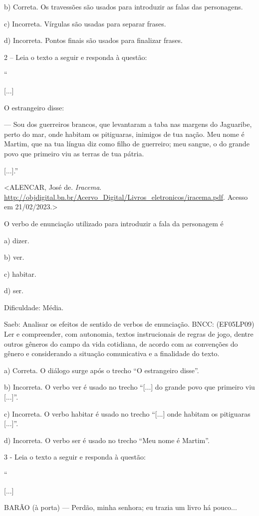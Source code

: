 b) Correta. Os travessões são usados para introduzir as falas das
personagens.

c) Incorreta. Vírgulas são usadas para separar frases.

d) Incorreta. Pontos finais são usados para finalizar frases.

2 -- Leia o texto a seguir e responda à questão:

``

{[}...{]}

O estrangeiro disse:

--- Sou dos guerreiros brancos, que levantaram a taba nas margens do
Jaguaribe, perto do mar, onde habitam os pitiguaras, inimigos de tua
nação. Meu nome é Martim, que na tua língua diz como filho de guerreiro;
meu sangue, o do grande povo que primeiro viu as terras de tua pátria.

{[}...{]}.''

\textless{}ALENCAR, José de. \emph{Iracema}.
\url{http://objdigital.bn.br/Acervo_Digital/Livros_eletronicos/iracema.pdf}.
Acesso em 21/02/2023.\textgreater{}

O verbo de enunciação utilizado para introduzir a fala da personagem é

a) dizer.

b) ver.

c) habitar.

d) ser.

Dificuldade: Média.

Saeb: Analisar os efeitos de sentido de verbos de enunciação. BNCC:
(EF05LP09) Ler e compreender, com autonomia, textos instrucionais de
regras de jogo, dentre outros gêneros do campo da vida cotidiana, de
acordo com as convenções do gênero e considerando a situação
comunicativa e a finalidade do texto.

a) Correta. O diálogo surge após o trecho ``O estrangeiro disse''.

b) Incorreta. O verbo ver é usado no trecho ``{[}...{]} do grande povo
que primeiro viu {[}...{]}''.

c) Incorreta. O verbo habitar é usado no trecho ``{[}...{]} onde habitam
os pitiguaras {[}...{]}''.

d) Incorreta. O verbo ser é usado no trecho ``Meu nome é Martim''.

3 - Leia o texto a seguir e responda à questão:

``

{[}...{]}

BARÃO (à porta) --- Perdão, minha senhora; eu trazia um livro há
pouco...

